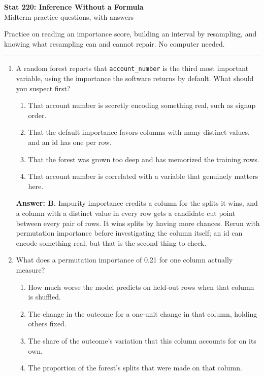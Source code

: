 \documentclass[11pt]{article}
\begin{document}
\begin{center}
{\Large\textbf{Stat 220: Inference Without a Formula}}\\[3pt]
{\large Midterm practice questions, with answers}\\[6pt]
\end{center}

Practice on reading an importance score, building an interval by resampling, and knowing what
resampling can and cannot repair. No computer needed.

\vspace{8pt}
\hrule
\vspace{10pt}

\begin{enumerate}[itemsep=14pt]
\item A random forest reports that \texttt{account\_number} is the third most important variable, using the importance the software returns by default. What should you suspect first?

\begin{enumerate}[label=\Alph*., itemsep=1pt, topsep=3pt]
  \item That account number is secretly encoding something real, such as signup order.
  \item That the default importance favors columns with many distinct values, and an id has one per row.
  \item That the forest was grown too deep and has memorized the training rows.
  \item That account number is correlated with a variable that genuinely matters here.
\end{enumerate}

\vspace{2pt}
\textbf{Answer: B.} Impurity importance credits a column for the splits it wins, and a column with a distinct value in every row gets a candidate cut point between every pair of rows. It wins splits by having more chances. Rerun with permutation importance before investigating the column itself; an id can encode something real, but that is the second thing to check.
\vspace{4pt}

\item What does a permutation importance of 0.21 for one column actually measure?

\begin{enumerate}[label=\Alph*., itemsep=1pt, topsep=3pt]
  \item How much worse the model predicts on held-out rows when that column is shuffled.
  \item The change in the outcome for a one-unit change in that column, holding others fixed.
  \item The share of the outcome's variation that this column accounts for on its own.
  \item The proportion of the forest's splits that were made on that column.
\end{enumerate}


\end{enumerate}
\end{document}
